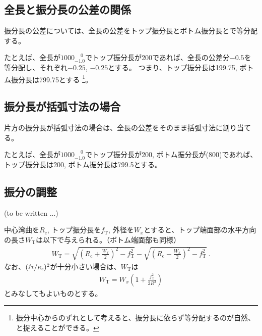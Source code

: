 \subsection{全長と振分長の公差の関係}
振分長の公差については、全長の公差をトップ振分長とボトム振分長とで等分配する。

たとえば、全長が$1000^{\phantom +0}_{-1.0}$でトップ振分長が200であれば、全長の公差分$-0.5$を等分配し、それぞれ$-0.25$, $-0.25$とする。
つまり、トップ振分長は199.75, ボトム振分長は799.75とする
\footnote{振分中心からのずれとして考えると、振分長に依らず等分配するのが自然、と捉えることができる。}。


\subsection{振分長が括弧寸法の場合}
片方の振分長が括弧寸法の場合は、全長の公差をそのまま括弧寸法に割り当てる。

たとえば、全長が$1000^{\phantom +0}_{-1.0}$でトップ振分長が200, ボトム振分長が(800)であれば、トップ振分長は200, ボトム振分長は799.5とする。


\subsection{振分の調整\TBW}
(to be written ...)


\clearpage
中心湾曲を$R_\mathrm c$, トップ振分長を$f_\mathrm T$, 外径を$W_x$とすると、トップ端面部の水平方向の長さ$W_\mathrm T$は以下で与えられる。（ボトム端面部も同様）
\begin{align*}
  W_\mathrm T
  = \sqrt{\left(R_\mathrm c+\frac{W_x}2\right)^{\!2}-f_\mathrm T^2}
    -\sqrt{\left(R_\mathrm c-\frac{W_x}2\right)^{\!2}-f_\mathrm T^2}\ .
\end{align*}
なお、$(\nicefrac{f_\mathrm T}{R_\mathrm c})^2$が十分小さい場合は、$W_\mathrm T$は
\begin{align*}
  W_\mathrm T
  = W_x\!\left(1+\frac{f_\mathrm T^2}{2R^2}\right)
\end{align*}
とみなしてもよいものとする。



